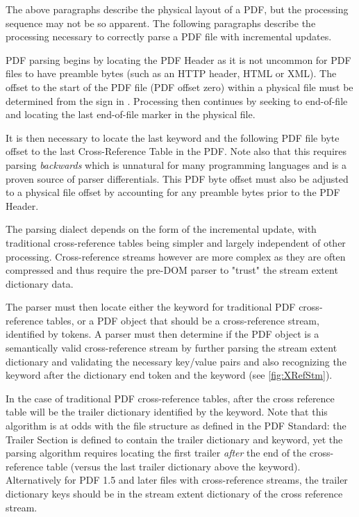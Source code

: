The above paragraphs describe the physical layout of a PDF, but the processing sequence may not be so apparent. The following paragraphs describe the processing necessary to correctly parse a PDF file with incremental updates.

PDF parsing begins by locating the PDF Header as it is not uncommon for PDF files to have 
preamble bytes (such as an HTTP header, HTML or XML). The offset to the start of the PDF file 
(PDF offset zero)
within a physical file must be determined from the \lstcd{\%} sign in . 
Processing then continues by seeking to end-of-file and locating the last end-of-file marker  in the physical file.

It is then necessary to locate the last  keyword and the following PDF file byte offset 
to the last Cross-Reference Table in the PDF. Note also that this requires parsing \emph{backwards}
which is unnatural for many programming languages and is a proven source of parser differentials. This PDF byte offset must also be adjusted to a physical file offset by accounting for any preamble bytes prior to the PDF Header.

The parsing dialect depends on the form of the incremental update, with
traditional cross-reference tables being simpler and largely independent of
other processing. Cross-reference streams however are more complex as they are
often compressed and thus require the pre-DOM parser to "trust" the stream
extent dictionary data.

The parser must then locate either the  keyword for
traditional PDF cross-reference tables, or a PDF object that should be
a cross-reference stream, identified by  tokens. 
A parser must then determine if the PDF object is a
semantically valid cross-reference stream by further parsing the stream extent dictionary and 
validating the necessary key/value pairs and also recognizing the  keyword after the dictionary end token \lstcd{>>} and the  keyword (see \cref{fig:XRefStm}). 

In the case of traditional PDF
cross-reference tables, after the cross reference table will be the
trailer dictionary identified by the  keyword. 
Note that this algorithm is at
odds with the file structure as defined in the PDF Standard: the Trailer Section is defined
to contain the trailer dictionary and  keyword, yet the parsing algorithm
requires locating the first trailer \emph{after} the end of the cross-reference table 
(versus the last trailer dictionary above the  keyword). 
Alternatively for PDF 1.5 and later files with cross-reference
streams, the trailer dictionary keys should be in the stream extent
dictionary of the cross reference stream. 

